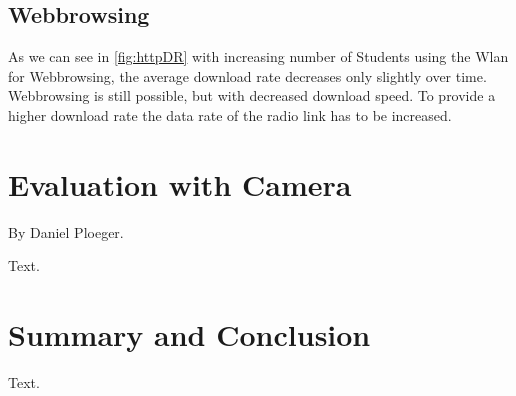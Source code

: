 \documentclass[a4paper,10pt]{book}\usepackage{graphicx}
\begin{document}
\section{Webbrowsing}
As we can see in \ref{fig:httpDR} with increasing number of Students using the Wlan for Webbrowsing, the average download rate decreases only slightly over time. Webbrowsing is still possible, but with decreased download speed.
To provide a higher download rate the data rate of the radio link has to be increased. 



\chapter{Evaluation with Camera}
By Daniel Ploeger.

Text.
         

\chapter{Summary and Conclusion}

Text.
\end{document}
